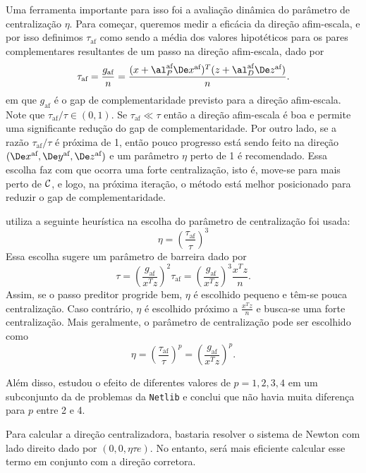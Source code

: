 Uma ferramenta importante para isso foi a avaliação dinâmica do parâmetro de
centralização $\eta$. Para começar, queremos medir a eficácia da direção
afim-escala, e por isso definimos $\tau_{\text{af}}$ como sendo a média dos valores
hipotéticos para os pares complementares resultantes de um passo na direção
afim-escala, dado por 
\begin{equation}
\label{eq:tau-affine}
 \tau_{\text{af}} = \frac{g_{\text{af}}}{n} = \frac{(x+\al_P^{\text{af}}\dex)^T
(z+\al_D^{\text{af}}\dez)}{n}.
\end{equation}
em que $g_{\text{af}}$ é o gap de complementaridade previsto para a direção afim-escala.
Note que $\tau_{\text{af}}/\tau\in(0,1)$. Se $\tau_{\text{af}}\ll\tau$ então a direção afim-escala é
boa e permite uma significante redução do gap de complementaridade. Por outro
lado, se a razão $\tau_{\text{af}}/\tau$ é próxima de 1, então pouco progresso está sendo
feito na direção  $(\dex, \dey, \dez)$ e um parâmetro $\eta$ perto de 1 é
recomendado. Essa escolha faz com que ocorra uma forte centralização, isto é,
move-se para mais perto de $\mathcal{C}$, e logo, na próxima iteração, o método está
melhor posicionado para reduzir o gap de complementaridade.

 \textcite{Mehrotra:1992wr} utiliza a seguinte heurística na escolha do parâmetro
 de centralização foi usada:
\begin{equation}\label{eq:Mehrotra-centralizer-parameter}
\eta = \left(\frac{\tau_{\text{af}}}{\tau}\right)^3
\end{equation}
Essa escolha sugere um parâmetro de barreira dado por 
\begin{equation}\label{eq:Mehrotra-barrier-parameter}
\tau = \left(\frac{g_{\text{af}}}{x^Tz}\right)^2\tau_{\text{af}} =
\left(\frac{g_{\text{af}}}{x^Tz}\right)^3\frac{x^Tz}{n}.
\end{equation}
Assim, se o passo preditor progride bem, $\eta$ é escolhido pequeno e têm-se
pouca centralização. Caso contrário, $\eta$ é escolhido próximo a $\frac{x^Tz}{n}$ e busca-se
uma forte centralização. Mais geralmente, o parâmetro de
centralização pode ser escolhido como
\[
\eta = \left(\frac{\tau_{\text{af}}}{\tau}\right)^p = \left(\frac{g_{\text{af}}}{x^Tz}\right)^p.
\]

Além disso, \textcite{Mehrotra:1992wr} estudou o efeito de diferentes valores de
$p= 1,2,3,4$ em um subconjunto da de problemas da \texttt{Netlib} e conclui que não havia
 muita diferença para $p$ entre 2 e 4.

Para calcular a direção centralizadora, bastaria resolver o sistema de Newton
com lado direito dado por $(0,0,\eta \tau e)$. No entanto, será mais eficiente
calcular esse termo em conjunto com a direção corretora. 


